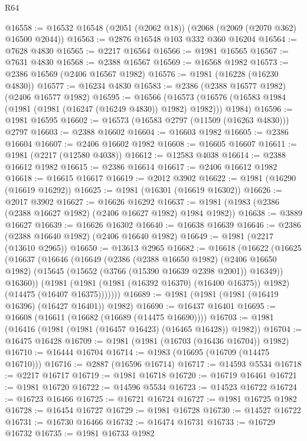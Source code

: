 \begin{lexlean}{R64}
\begin{coremodule}
@16558 := @16532 @16548 (@2051 (@2062 @18)) (@2068 (@2069 (@2070 @362) @16500 @2044))
@16563 := @2876 @16548 @103 @332 @360 @16204
@16564 := @7628 @4830
@16565 := @2217 @16564
@16566 := @1981 @16565
@16567 := @7631 @4830
@16568 := @2388 @16567
@16569 := @16568 @1982
@16573 := @2386 @16569 (@2406 @16567 @1982)
@16576 := @1981 (@16228 (@16230 @4830))
@16577 := @16234 @4830
@16583 := @2386 (@2388 @16577 @1982) (@2406 @16577 @1982)
@16595 := @16566
    (@16573 (@16576 (@16583 @1984 (@1981 (@1981 (@16247 (@16249 @4830)) @1982) @1982))) @1984)
@16596 := @1981 @16595
@16602 := @16573 (@16583 @2797 (@11509 (@16263 @4830))) @2797
@16603 := @2388 @16602
@16604 := @16603 @1982
@16605 := @2386 @16604
@16607 := @2406 @16602 @1982
@16608 := @16605 @16607
@16611 := @1981 (@2217 (@12580 @4038))
@16612 := @12583 @4038
@16614 := @2388 @16612 @1982
@16615 := @2386 @16614
@16617 := @2406 @16612 @1982
@16618 := @16615 @16617
@16619 := @2012 @3902
@16622 := @1981 (@16290 (@16619 @16292))
@16625 := @1981 (@16301 (@16619 @16302))
@16626 := @2017 @3902
@16627 := @16626 @16292
@16637 := @1981 (@1983 (@2386 (@2388 @16627 @1982) (@2406 @16627 @1982) @1984 @1982))
@16638 := @3889 @16627
@16639 := @16626 @16302
@16640 := @16638 @16639
@16646 := @2386 (@2388 @16640 @1982) (@2406 @16640 @1982)
@16649 := @1981 (@2217 (@13610 @2965))
@16650 := @13613 @2965
@16682 := @16618
    (@16622
      (@16625
        (@16637
          (@16646
            (@16649
              (@2386
                (@2388 @16650 @1982)
                (@2406 @16650 @1982)
                (@15645 (@15652 (@3766 (@15390 @16639 @2398 @2001)) @16349))
                @16360))
            (@1981
              (@1981 (@1981 (@16392 @16370) (@16400 @16375)) @1982)
              (@14475 (@16407 @16375)))))))
@16689 := @1981 (@1981 (@1981 (@16419 @16396) (@16427 @16401)) @1982)
@16690 := @16437 @16401
@16695 := @16608 (@16611 (@16682 (@16689 (@14475 @16690))))
@16703 := @1981 (@16416 (@1981 (@1981 (@16457 @16423) (@16465 @16428)) @1982))
@16704 := @16475 @16428
@16709 := @1981 (@1981 (@16703 (@16436 @16704)) @1982)
@16710 := @16444 @16704
@16714 := @1983 (@16695 (@16709 (@14475 @16710)))
@16716 := @2887 (@16596 @16714)
@16717 := @14593 @5534
@16718 := @2217 @16717
@16719 := @1981 @16718
@16720 := @16719 @16461
@16721 := @1981 @16720
@16722 := @14596 @5534
@16723 := @14523 @16722
@16724 := @16723 @16466
@16725 := @16721 @16724
@16727 := @1981 @16725 @1982
@16728 := @16454 @16727
@16729 := @1981 @16728
@16730 := @14527 @16722
@16731 := @16730 @16466
@16732 := @16474 @16731
@16733 := @16729 @16732
@16735 := @1981 @16733 @1982

\end{coremodule}
\end{lexlean}
